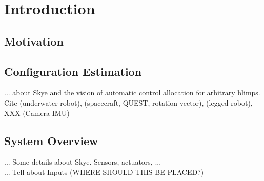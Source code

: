 \chapter{Introduction}
\label{chap:introduction}

\section{Motivation}

\section{Configuration Estimation}
... about Skye and the vision of automatic control allocation for arbitrary blimps. Cite \cite{Doniec} (underwater robot), \cite{Shuster1991} (spacecraft, QUEST, rotation vector), \citep{Bloesch2013} (legged robot), XXX (Camera IMU)

\section{System Overview}
... Some details about Skye. Sensors, actuators, ... \cite{Skye2013}
\\
... Tell about Inputs (WHERE SHOULD THIS BE PLACED?)